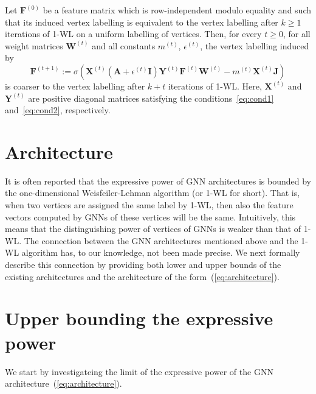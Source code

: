 \begin{proposition}
Let $\mathbf{F}^{(0)}$ be a feature matrix which is row-independent modulo equality and
such that its induced vertex labelling is equivalent to the vertex labelling after $k\geq 1$ iterations of 1-WL on a uniform labelling of vertices. Then, for every $t\geq 0$, for all weight matrices $\mathbf{W}^{(t)}$ and all constants $m^{(t)}$, $\epsilon^{(t)}$, the vertex labelling induced by 
$$\mathbf{F}^{(t+1)}:=\sigma(\mathbf{X}^{(t)}(\mathbf{A} + \epsilon^{(t)}\mathbf{I})\mathbf{Y}^{(t)}\mathbf{F}^{(t)}\mathbf{W}^{(t)} - m^{(t)}\mathbf{X}^{(t)}\mathbf{J}) $$
is coarser to the vertex labelling after $k+t$ iterations of 1-WL. Here, $\mathbf{X}^{(t)}$ and $\mathbf{Y}^{(t)}$ are positive diagonal matrices satisfying the conditions~\eqref{eq:cond1} and~\eqref{eq:cond2}, respectively.
\end{proposition}


\section{Architecture}
It is often reported that the expressive power of GNN architectures is bounded by the one-dimensional Weisfeiler-Lehman algorithm (or 1-WL for short). That is, when two vertices
are assigned the same label by 1-WL, then also the feature vectors computed by GNNs of these vertices will be the same. Intuitively, this means that the distinguishing power of vertices of GNNs is weaker than that of 1-WL. The connection between the GNN architectures mentioned above and the 1-WL algorithm has, to our knowledge, not been made precise. We next formally describe this connection by providing both lower and upper bounds of the existing architectures and the architecture of the form~(\ref{eq:architecture}).

\section{Upper bounding the expressive power}
We start by investigateing the limit of the expressive power of the GNN architecture~(\ref{eq:architecture}).


